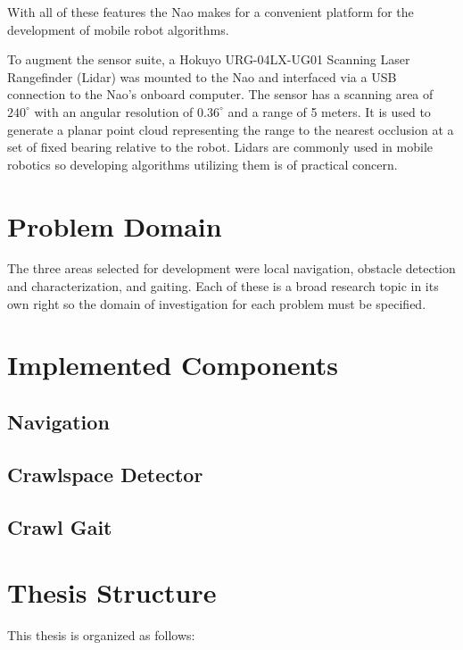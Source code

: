 With all of these features the Nao makes for a convenient platform for the development of mobile robot algorithms.

To augment the sensor suite, a Hokuyo URG-04LX-UG01 Scanning Laser Rangefinder (Lidar) was mounted to the Nao and
interfaced via a USB connection to the Nao's onboard computer. The sensor has a scanning area of $240^\circ$ with 
an angular resolution of $0.36^\circ$ and a range of 5 meters. It is used to generate a planar point cloud representing
the range to the nearest occlusion at a set of fixed bearing relative to the robot. Lidars are commonly used in mobile
robotics so developing algorithms utilizing them is of practical concern.

\section{Problem Domain}
The three areas selected for development were local navigation, obstacle detection and characterization, and gaiting.
Each of these is a broad research topic in its own right so the domain of investigation for each problem
must be specified. 

\section{Implemented Components}

\subsection{Navigation}
\subsection{Crawlspace Detector}
\subsection{Crawl Gait}

\section{Thesis Structure}
This thesis is organized as follows: 

